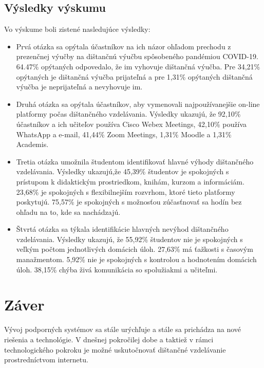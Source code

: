\documentclass[10pt,oneside,slovak,a4paper]{article}
\begin{document}
\subsection{Výsledky výskumu}%
Vo výskume boli zistené nasledujúce výsledky\cite{covid19}: %
\begin{itemize}
	
	\item Prvá otázka sa opýtala účastníkov na ich názor ohľadom prechodu z prezenčnej výučby na dištančnú výučbu spôsobeného pandémiou COVID-19. 64.47\% opýtaných odpovedalo, že im vyhovuje dištančná výučba. Pre 34,21\% opýtaných je dištančná výučba prijateľná a pre 1,31\% opýtaných dištančná výučba je neprijateľná a nevyhovuje im.
	\item Druhá otázka sa opýtala účastníkov, aby vymenovali najpoužívanejšie on-line platformy počas dištančného vzdelávania. Výsledky ukazujú, že 92,10\% účastníkov a ich učiteľov používa Cisco Webex Meetings, 42,10\% používa WhatsApp a e-mail, 41,44\% Zoom Meetings, 1,31\% Moodle a 1,31\% Academis.
	\item Tretia otázka umožnila študentom identifikovať hlavné výhody dištančného vzdelávania. Výsledky ukazujú,že 45,39\% študentov je spokojných s prístupom k didaktickým prostriedkom, knihám, kurzom a informáciám. 23,68\% je spokojných s flexibilnejším rozvrhom, ktoré tieto platformy poskytujú. 75,57\% je spokojných s možnosťou zúčasťnovať sa hodín bez ohľadu na to, kde sa nachádzajú.
	\item Štvrtá otázka sa týkala identifikácie hlavných nevýhod dištančného vzdelávania. Výsledky ukazujú, že 55,92\% študentov nie je spokojných s veľkým počtom jednotlivých domácich úloh. 27,63\% má ťažkosti s časovým manažmentom. 5,92\% nie je spokojných s kontrolou a hodnotením domácich úloh. 38,15\% chýba živá komunikácia so spolužiakmi a učiteľmi.
\end{itemize}



\section*{Záver}
Vývoj podporných systémov sa stále urýchľuje a stále sa prichádza na nové riešenia a technológie. V dnešnej pokročilej dobe a taktiež v rámci technologického pokroku je možné uskutočnovať dištančné vzdelávanie prostredníctvom internetu.
\end{document}
